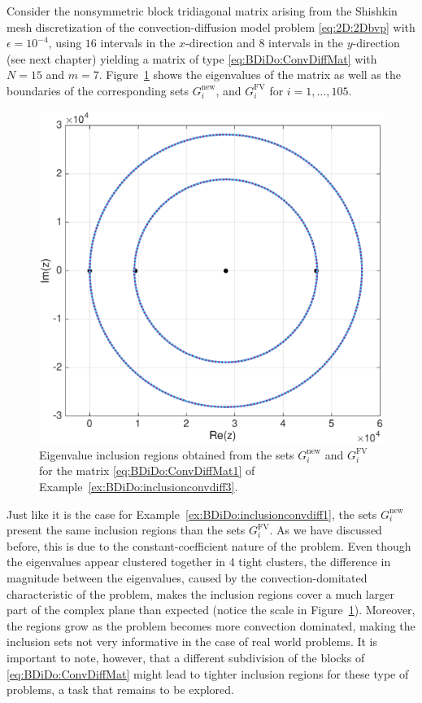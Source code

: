\begin{example}\label{ex:BDiDo:inclusionconvdiff3}{\textrm
Consider the  nonsymmetric block tridiagonal matrix arising from the Shishkin mesh discretization of the convection-diffusion model problem \eqref{eq:2D:2Dbvp} with $\epsilon=10^{-4}$, using $16$ intervals in the $x$-direction and $8$ intervals in the $y$-direction (see next chapter) yielding a matrix of type \eqref{eq:BDiDo:ConvDiffMat} with $N=15$ and $m=7$. \textnormal{Figure~\ref{fig:BDiDo:ex:inclusion5}} shows the eigenvalues of the matrix as well as the boundaries of the corresponding sets $G_i^{\text{new}}$, and $G_i^{\text{FV}}$ for $i=1,\ldots,105$.
%
\begin{figure}[tbph]
\centering
\vspace*{-0.5cm}
\includegraphics[width=0.6\linewidth]{figures/Example418}
\vspace*{-0.2cm}
\caption{Eigenvalue inclusion regions obtained from the sets
$G_i^{\text{new}}$ and $G_i^{\text{FV}}$ for the matrix \eqref{eq:BDiDo:ConvDiffMat1} of Example~\ref{ex:BDiDo:inclusionconvdiff3}.}
\label{fig:BDiDo:ex:inclusion5}
\end{figure}
%
Just like it is the case for \textnormal{Example~\ref{ex:BDiDo:inclusionconvdiff1}}, the sets $G_i^{\text{new}}$ present the same inclusion regions than the sets $G_i^{\text{FV}}$. As we have discussed before, this is due to the constant-coefficient nature of the problem. Even though the eigenvalues appear clustered together in 4 tight clusters, the difference in magnitude between the eigenvalues, caused by the convection-domitated characteristic of the problem, makes the inclusion regions cover a much larger part of the complex plane than expected (notice the scale in \textnormal{Figure~\ref{fig:BDiDo:ex:inclusion5}}). Moreover, the regions grow as the problem becomes more convection dominated, making the inclusion sets not very informative in the case of real world problems. It is important to note, however, that a different subdivision of the blocks of \eqref{eq:BDiDo:ConvDiffMat} might lead to tighter inclusion regions for these type of problems, a task that remains to be explored.
}\end{example}


